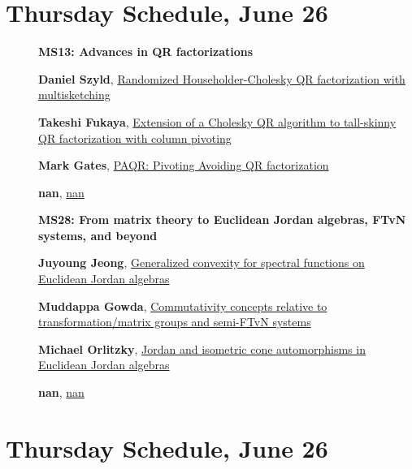 \documentclass[ILAS2025-program.tex]{subfiles}
\begin{document}
\section*{Thursday Schedule, June 26 }
        
        \begin{description}
    \item[] {\color{mstitle}\textbf{MS13: Advances in QR factorizations}} 
    \item[] \hypertarget{up0339}{}\textbf{Daniel Szyld}, \hyperlink{down0339}{Randomized Householder-Cholesky QR factorization with multisketching}
        \item[] \hypertarget{up0340}{}\textbf{Takeshi Fukaya}, \hyperlink{down0340}{Extension of a Cholesky QR algorithm to tall-skinny QR factorization with column pivoting
}
        \item[] \hypertarget{up0341}{}\textbf{Mark Gates}, \hyperlink{down0341}{PAQR: Pivoting Avoiding QR factorization}
        \item[] \hypertarget{up0342}{}\textbf{nan}, \hyperlink{down0342}{nan}
        \end{description}
    \begin{description}
    \item[] {\color{mstitle}\textbf{MS28: From matrix theory to Euclidean Jordan algebras, FTvN systems, and beyond}} 
    \item[] \hypertarget{up0383}{}\textbf{Juyoung Jeong}, \hyperlink{down0383}{Generalized convexity for spectral functions on Euclidean Jordan algebras
}
        \item[] \hypertarget{up0384}{}\textbf{Muddappa Gowda}, \hyperlink{down0384}{Commutativity concepts relative to transformation/matrix groups and semi-FTvN systems}
        \item[] \hypertarget{up0385}{}\textbf{Michael Orlitzky}, \hyperlink{down0385}{Jordan and isometric cone automorphisms in Euclidean Jordan algebras}
        \item[] \hypertarget{up0386}{}\textbf{nan}, \hyperlink{down0386}{nan}
        \end{description}
    \newpage

\section*{Thursday Schedule, June 26 }
        
\end{document}
